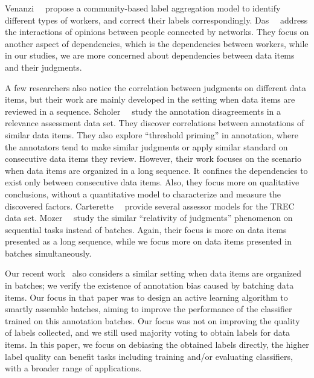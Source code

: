 Venanzi~\etal~\cite{venanzi:www2014} propose a community-based label aggregation model to identify different types of workers, 
and correct their labels correspondingly.  
Das~\etal~\cite{das:kdd2013} address the interactions of opinions between people connected by networks.
They focus on another aspect of dependencies, 
which is the dependencies between workers, 
while in our studies, we are more concerned about dependencies between data items and their judgments.  



A few researchers also notice the correlation between judgments on different data items, 
but their work are mainly developed in the setting when data items are reviewed in a sequence.  
Scholer~\etal~\cite{scholer:sigir2013,scholer:sigir2011} study the annotation disagreements in 
a relevance assessment data set.  
They discover correlations between annotations of similar data items.  %
They also explore ``threshold priming'' in annotation, 
where the annotators tend to make similar judgments or apply similar standard on consecutive data items they review. 
However, their work focuses on the scenario when data items are organized in a long sequence.  
It confines the dependencies to exist only between consecutive data items.  
Also, they focus more on qualitative conclusions, without a quantitative model to characterize and measure the discovered factors.  
Carterette~\etal~\cite{carterette:effect2010} provide several assessor models for the TREC data set.  
Mozer~\etal~\cite{mozer:nips2010} study the similar ``relativity of
judgments'' phenomenon on sequential tasks instead of batches.  
Again, their focus is more on data items presented as a long sequence, 
while we focus more on data items presented in batches simultaneously.  

Our recent work~\cite{zhuang:wsdm2015} also considers a similar setting 
when data items are organized in batches; 
we verify the existence of annotation bias caused by batching data items.  
Our focus in that paper was to design an active learning algorithm to smartly assemble batches, 
aiming to improve the performance of the classifier trained on this annotation batches.  
Our focus was not on improving the quality of labels collected, 
and we still used majority voting to obtain labels for data items.  
In this paper, we focus on debiasing the obtained labels directly,
the higher label quality can benefit tasks including training and/or evaluating classifiers, 
with a broader range of applications.


